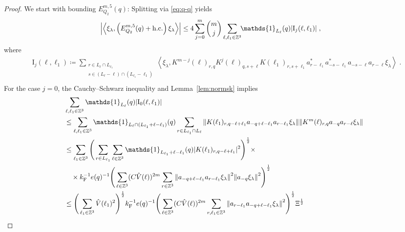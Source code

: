 \documentclass[12pt,a4paper]{article}
\numberwithin{equation}{section}
\newcommand{\1}{\mathbb{I}}
\newcommand{\F}{\mathrm{F}}
\newcommand{\I}{\mathrm{I}}
\newcommand{\Zstar}{\mathbb{Z}^3} %
\newcommand{\Z}{\mathbb{Z}}
\newcommand{\half}{\frac{1}{2}}
\newcommand{\eva}[1]{\left\langle #1 \right\rangle}
\theoremstyle{plain}
\theoremstyle{definition}
\theoremstyle{remark}
\theoremstyle{plain}
\theoremstyle{definition}
\theoremstyle{remark}
\begin{document}
\begin{proof}
We start with bounding $ E^{m,5}_{Q_2}(q) $: Splitting via \eqref{eq:q-q} yields
\begin{equation} \label{eq:EQ2131}
\begin{aligned}
	& \abs{\eva{\xi_\lambda,\left(E^{m,5}_{Q_2}(q) +\mathrm{h.c.}\right) \xi_\lambda }}
	\le 4 \sum_{j=0}^m {{m}\choose j} \sum_{\ell,\ell_1  \in \Zstar}\!\! \mathds{1}_{L_\ell}(q) |\I_j(\ell, \ell_1)| \;,
	\end{aligned}
\end{equation}
where
\begin{equation}
\begin{aligned}
	& \I_j(\ell, \ell_1)
	\coloneq \sum_{\substack{r\in L_{\ell} \cap L_{\ell_1}\\ s \in (L_{\ell} - \ell) \cap (L_{\ell_1} - \ell_1)}}
		\eva{\xi_\lambda, K^{m-j}(\ell)_{r,q} K^{j}(\ell)_{q,s+\ell} K(\ell_1)_{r,s+\ell_1} a^*_{r-\ell_1} a^*_{-s-\ell_1} a_{-s-\ell} a_{r-\ell} \xi_\lambda} \;. \\
\end{aligned}
\end{equation}
For the case $ j = 0 $, the Cauchy--Schwarz inequality and Lemma~\ref{lem:normsk} implies
\begin{align}
	&\sum_{\ell,\ell_1 \in \Zstar} \mathds{1}_{L_\ell}(q) |\I_0(\ell, \ell_1)| \nonumber\\
	&\leq \sum_{\ell,\ell_1 \in \Zstar} \mathds{1}_{L_\ell \cap (L_{\ell_1}+\ell-\ell_1)}(q) \sum\limits_{r\in L_{\ell_1} \cap L_\ell}
		\norm{ K(\ell_1)_{r,q-\ell+\ell_1} a_{-q+\ell-\ell_1} a_{r-\ell_1} \xi_\lambda}
		\norm{ K^m(\ell)_{r,q} a_{-q}a_{r-\ell} \xi_\lambda } \nonumber\\
	&\leq \sum_{\ell_1 \in \Zstar}
		\Bigg( \sum_{r\in L_{\ell_1}} \sum_{\ell \in \Z^3} \mathds{1}_{L_{\ell_1}+\ell-\ell_1}(q) |K(\ell_1)_{r,q-\ell+\ell_1}|^2 \Bigg)^{\half} \times \nonumber\\
	&\quad \times k_{\F}^{-1} e(q)^{-1} \Bigg( \sum_{\ell \in \Zstar} (C \hat{V}(\ell))^{2m} \sum_{r\in \Z^3} \norm{a_{-q+\ell-\ell_1} a_{r-\ell_1} \xi_\lambda}^2
		\norm{ a_{-q} \xi_\lambda }^2 \Bigg)^{\half} \nonumber\\
	&\leq \Bigg( \sum_{\ell_1 \in \Zstar} \hat{V}(\ell_1)^2 \Bigg)^{\half} k_{\F}^{-1} e(q)^{-1}
		\Bigg( \sum_{\ell \in \Zstar} (C \hat{V}(\ell))^{2m} \sum_{r,\ell_1 \in \Z^3} \norm{a_{r-\ell_1} a_{-q+\ell-\ell_1} \xi_\lambda}^2 \Bigg)^{\half} \Xi^{\half} \nonumber\\

\end{align}
\end{proof}
\end{document}
